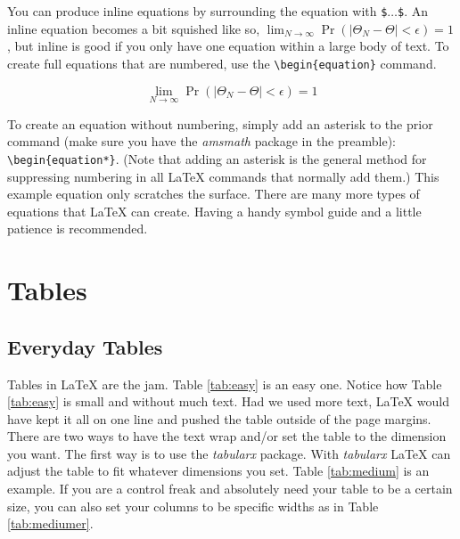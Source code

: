 \documentclass[12pt]{article}
\begin{document}
You can produce inline equations by surrounding the
equation with {\tt \$$\ldots$\$}. An inline equation becomes a bit
squished like so, $\lim_{N \rightarrow \infty} \Pr(\vert \Theta_{N} -
\Theta \vert < \epsilon) = 1$, but inline is good if you only have one
equation within a large body of text. To create full equations that
are numbered, use the \texttt{\textbackslash{begin\{equation\}}} command.

\begin{equation}
\lim_{N \rightarrow \infty} \Pr(\vert \Theta_{N} - \Theta \vert < \epsilon) = 1
\end{equation}

To create an equation without numbering, simply add an asterisk to the
prior command (make sure you have the {\itshape amsmath} package in the
preamble): \texttt{\textbackslash{begin\{equation*\}}}. (Note that
adding an asterisk is the general method for suppressing numbering in
all \LaTeX{} commands that normally add them.) This example equation only 
scratches the surface. There are many more types of equations that \LaTeX{} 
can create. Having a handy symbol guide and a little patience is recommended.


\section{Tables}

\subsection{Everyday Tables}
Tables in \LaTeX{} are the jam. Table \ref{tab:easy} is an easy
one. Notice how Table \ref{tab:easy} is small and without much
text. Had we used more text, \LaTeX{} would have kept it all on one
line and pushed the table outside of the page margins. There are two
ways to have the text wrap and/or set the table to the dimension you
want. The first way is to use the {\itshape tabularx} package. With
{\itshape tabularx} \LaTeX{} can adjust the table to fit whatever
dimensions you set. Table \ref{tab:medium} is an example. If you are a
control freak and absolutely need your table to be a certain size, you
can also set your columns to be specific widths as in Table \ref{tab:mediumer}.
\end{document}
